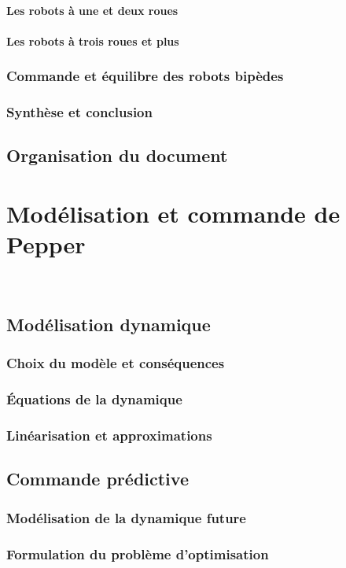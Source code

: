 \documentclass[12pt]{report}
\begin{document}
			\subsubsection{Les robots à une et deux roues}
			\subsubsection{Les robots à trois roues et plus}
		\subsection{Commande et équilibre des robots bipèdes}
		\subsection{Synthèse et conclusion}
	\section{Organisation du document}
\chapter{Modélisation et commande de Pepper}~
	\section{Modélisation dynamique}
		\subsection{Choix du modèle et conséquences}
		\subsection{Équations de la dynamique}
		\subsection{Linéarisation et approximations}
	\section{Commande prédictive}
		\subsection{Modélisation de la dynamique future}
		\subsection{Formulation du problème d'optimisation}
\end{document}
